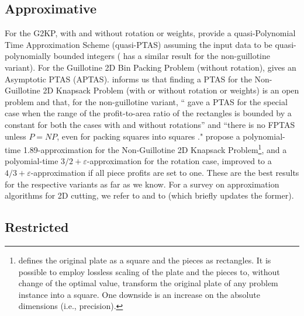 \documentclass[ppgc,prop-tese,english,formais,babel]{iiufrgs}
\begin{document}
\subsection{Approximative}

For the G2KP, with and without rotation or weights, \citet{abed:2015} provide a quasi-Polynomial Time Approximation Scheme (quasi-PTAS) assuming the input data to be quasi-polynomially bounded integers (\citet{anna:2015:quasi} has a similar result for the non-guillotine variant).
For the Guillotine 2D Bin Packing Problem (without rotation), \citet{bansal:2005} gives an Asymptotic PTAS (APTAS).
\citet{christensen:2017} informs us that finding a PTAS for the Non-Guillotine 2D Knapsack Problem (with or without rotation or weights) is an open problem and that, for the non-guillotine variant, ``\citet{bansal:2009} gave a PTAS for the special case when the range of the profit-to-area ratio of the rectangles is bounded by a constant for both the cases with and without rotations'' and ``there is no FPTAS unless \(P = NP\), even for packing squares into squares \citep{leung:1990}."
\citet{galvez:2017} propose a polynomial-time 1.89-approximation for the Non-Guillotine 2D Knapsack Problem\footnote{\citet{galvez:2017} defines the original plate as a square and the pieces as rectangles. It is possible to employ lossless scaling of the plate and the pieces to, without change of the optimal value, transform the original plate of any problem instance into a square. One downside is an increase on the absolute dimensions (i.e., precision).}, and a polyomial-time \(3/2 + \varepsilon\)-approximation for the rotation case, improved to a \(4/3 + \varepsilon\)-approximation if all piece profits are set to one.
These are the best results for the respective variants as far as we know.
For a survey on approximation algorithms for 2D cutting, we refer to \citet{christensen:2017} and to \citet{iori:2020} (which briefly updates the former).

\subsection{Restricted}
\end{document}

